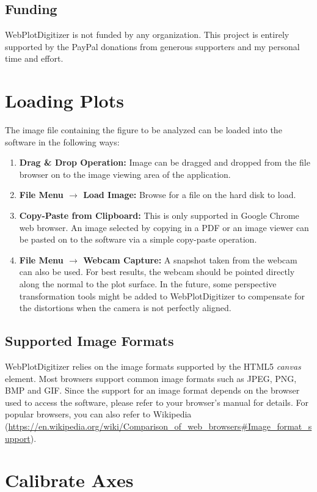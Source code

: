 \documentclass[letterpaper, 11pt]{article}
\begin{document}
\subsection{Funding}
WebPlotDigitizer is not funded by any organization. This project is entirely supported by the PayPal donations from generous supporters and my personal time and effort.

\section{Loading Plots}
The image file containing the figure to be analyzed can be loaded into the software in the following ways:
\begin{enumerate}
\item{{\bf Drag \& Drop Operation:} Image can be dragged and dropped from the file browser on to the image viewing area of the application.}
\item{{\bf File Menu $\rightarrow$ Load Image:} Browse for a file on the hard disk to load.}
\item{{\bf Copy-Paste from Clipboard:} This is only supported in Google Chrome web browser. An image selected by copying in a PDF or an image viewer can be pasted on to the software via a simple copy-paste operation.}
\item{{\bf File Menu $\rightarrow$ Webcam Capture:} A snapshot taken from the webcam can also be used. For best results, the webcam should be pointed directly along the normal to the plot surface. In the future, some perspective transformation tools might be added to WebPlotDigitizer to compensate for the distortions when the camera is not perfectly aligned.}  
\end{enumerate}

\subsection{Supported Image Formats}
WebPlotDigitizer relies on the image formats supported by the HTML5 \emph{canvas} element. Most browsers support common image formats such as JPEG, PNG, BMP and GIF. Since the support for an image format depends on the browser used to access the software, please refer to your browser's manual for details. For popular browsers, you can also refer to Wikipedia (\url{https://en.wikipedia.org/wiki/Comparison_of_web_browsers#Image_format_support}).

\section{Calibrate Axes}
\end{document}
